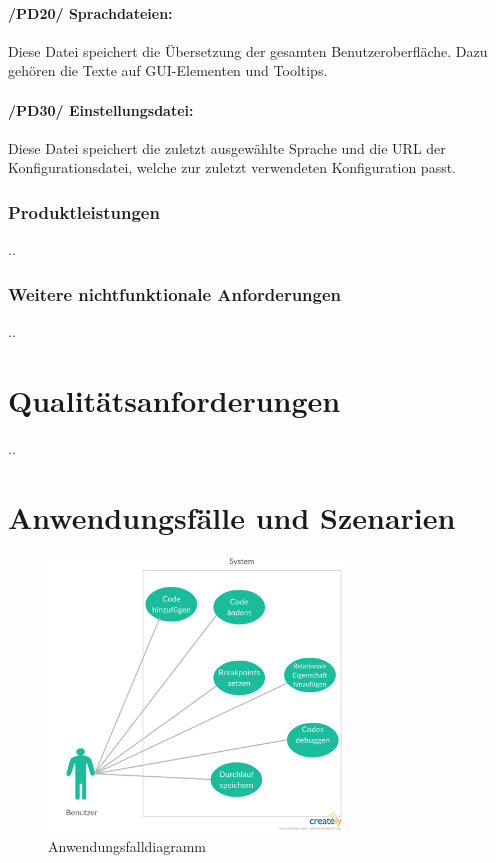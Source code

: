 \documentclass[parskip=full]{scrartcl}
\begin{document}
			\paragraph{/PD20/ Sprachdateien:}
			Diese Datei speichert die Übersetzung der gesamten Benutzeroberfläche.
			Dazu gehören die Texte auf GUI-Elementen und Tooltips.
			\paragraph{/PD30/ Einstellungsdatei:}
			Diese Datei speichert die zuletzt ausgewählte Sprache und die URL der 						Konfigurationsdatei, welche zur zuletzt verwendeten Konfiguration passt.
		\subsubsection{Produktleistungen}
		..
		\subsubsection{Weitere nichtfunktionale Anforderungen}
		..

\section{Qualitätsanforderungen}
..

\newpage
\section{Anwendungsfälle und Szenarien}
\begin{figure}[h] 
  \centering
     \includegraphics[width=0.7\textwidth]{Anwendungsfalldiagramm}
  \caption{Anwendungsfalldiagramm}
  \label{fig:Bild1}
\end{figure}
\end{document}
